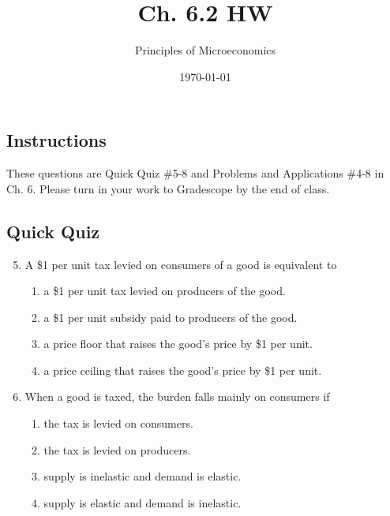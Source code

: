 \documentclass{article}
\title{Ch. 6.2 HW}
\author{Principles of Microeconomics}
\date{\today}
\begin{document}
\maketitle

\subsection*{Instructions}
These questions are Quick Quiz \#5-8 and Problems and Applications \#4-8 in Ch. 6. Please turn in your work to Gradescope by the end of class.

\subsection*{Quick Quiz}

\begin{enumerate}
\setcounter{enumi}{4}

\item A \$1 per unit tax levied on consumers of a good is equivalent to
	\begin{enumerate}
	
	\item a \$1 per unit tax levied on producers of the good.
	
	\item a \$1 per unit subsidy paid to producers of the good.
	
	\item a price floor that raises the good's price by \$1 per unit.
	
	\item a price ceiling that raises the good's price by \$1 per unit.
	
	\end{enumerate}
	
\item When a good is taxed, the burden falls mainly on consumers if
	\begin{enumerate}

	\item the tax is levied on consumers.
	
	\item the tax is levied on producers.
	
	\item supply is inelastic and demand is elastic.
	
	\item supply is elastic and demand is inelastic.
	
	\end{enumerate}
	

\end{enumerate}
\end{document}
